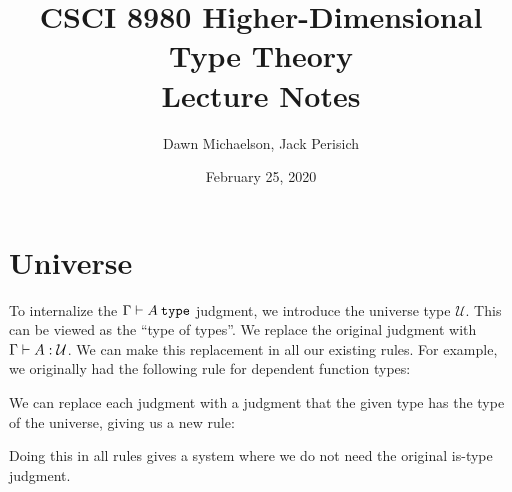 \documentclass[11pt]{article}
\title{CSCI 8980 Higher-Dimensional Type Theory\\ Lecture Notes}
\author{Dawn Michaelson, Jack Perisich}
\date{February 25, 2020}
\newcommand{\U}{\ensuremath{\mathcal{U}}}
\begin{document}
\maketitle





\section{Universe}
To internalize the $\istype{\Gamma}{A}$ judgment, we introduce the
universe type \U.  This can be viewed as the ``type of types''.  We
replace the original judgment with $\oftype{\Gamma}{A}{\U}$.
%
We can make this replacement in all our existing rules.  For example,
we originally had the following rule for dependent function types:
\begin{prooftree*}
\end{prooftree*}
We can replace each judgment with a judgment that the given type has
the type of the universe, giving us a new rule:
\begin{prooftree*}
  \hypo{\oftype{\Gamma}{A}{\U}}
  \hypo{\oftype{\Gamma, x:A}{B}{\U}}
  \infer2{\oftype{\Gamma}{\dfuntype{x}{A}{B}}{\U}}
\end{prooftree*}
Doing this in all rules gives a system where we do not need the
original is-type judgment.
\end{document}
